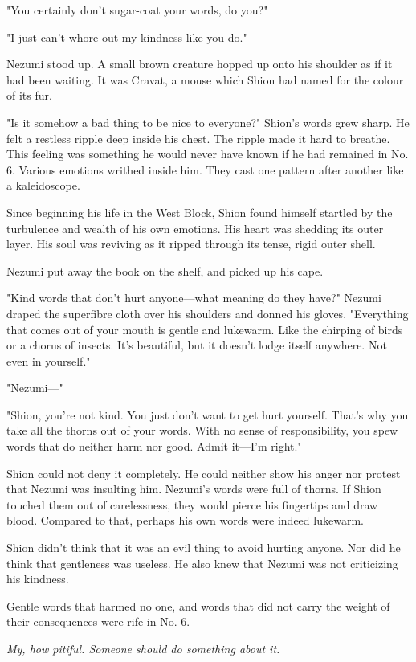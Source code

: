 "You certainly don't sugar-coat your words, do you?"

"I just can't whore out my kindness like you do."

Nezumi stood up. A small brown creature hopped up onto his shoulder as
if it had been waiting. It was Cravat, a mouse which Shion had named for
the colour of its fur.

"Is it somehow a bad thing to be nice to everyone?" Shion's words grew
sharp. He felt a restless ripple deep inside his chest. The ripple made
it hard to breathe. This feeling was something he would never have known
if he had remained in No. 6. Various emotions writhed inside him. They
cast one pattern after another like a kaleidoscope.

Since beginning his life in the West Block, Shion found himself startled
by the turbulence and wealth of his own emotions. His heart was shedding
its outer layer. His soul was reviving as it ripped through its tense,
rigid outer shell.

Nezumi put away the book on the shelf, and picked up his cape.

"Kind words that don't hurt anyone---what meaning do they have?" Nezumi
draped the superfibre cloth over his shoulders and donned his gloves.
"Everything that comes out of your mouth is gentle and lukewarm. Like
the chirping of birds or a chorus of insects. It's beautiful, but it
doesn't lodge itself anywhere. Not even in yourself."

"Nezumi---"

"Shion, you're not kind. You just don't want to get hurt yourself.
That's why you take all the thorns out of your words. With no sense of
responsibility, you spew words that do neither harm nor good. Admit
it---I'm right."

Shion could not deny it completely. He could neither show his anger nor
protest that Nezumi was insulting him. Nezumi's words were full of
thorns. If Shion touched them out of carelessness, they would pierce his
fingertips and draw blood. Compared to that, perhaps his own words were
indeed lukewarm.

Shion didn't think that it was an evil thing to avoid hurting anyone.
Nor did he think that gentleness was useless. He also knew that Nezumi
was not criticizing his kindness.

Gentle words that harmed no one, and words that did not carry the weight
of their consequences were rife in No. 6.

\emph{My, how pitiful. Someone should do something about it.}

